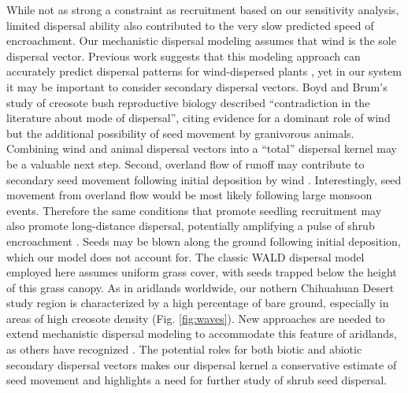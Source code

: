 \documentclass[11pt]{article}\usepackage[]{graphicx}\usepackage[usenames,dvipsnames]{xcolor}
\begin{document}
While not as strong a constraint as recruitment based on our sensitivity analysis, limited dispersal ability also contributed to the very slow predicted speed of encroachment. 
Our mechanistic dispersal modeling assumes that wind is the sole dispersal vector. 
Previous work suggests that this modeling approach can accurately predict dispersal patterns for wind-dispersed plants \citep{skarpaas2007dispersal}, yet in our system it may be important to consider secondary dispersal vectors. 
Boyd and Brum's \citeyear{boyd1983postdispersal} study of creosote bush reproductive biology described ``contradiction in the literature about mode of dispersal'', citing evidence for a dominant role of wind but the additional possibility of seed movement by granivorous animals. 
Combining wind and animal dispersal vectors into a ``total'' dispersal kernel \citep{rogers2019total} may be a valuable next step. 
Second, overland flow of runoff may contribute to secondary seed movement following initial deposition by wind \citep{thompson2014secondary}. 
Interestingly, seed movement from overland flow would be most likely following large monsoon events. 
Therefore the same conditions that promote seedling recruitment may also promote long-distance dispersal, potentially amplifying a pulse of shrub encroachment \citep{ellner2012temporally}. 
Seeds may be blown along the ground following initial deposition, which our model does not account for.
The classic WALD dispersal model employed here assumes uniform grass cover, with seeds trapped below the height of this grass canopy. 
As in aridlands worldwide, our nothern Chihuahuan Desert study region is characterized by a high percentage of bare ground, especially in areas of high creosote density (Fig. \ref{fig:waves}). 
New approaches are needed to extend mechanistic dispersal modeling to accommodate this feature of aridlands, as others have recognized \citep{thompson2014secondary}. 
The potential roles for both biotic and abiotic secondary dispersal vectors makes our dispersal kernel a conservative estimate of seed movement and highlights a need for further study of shrub seed dispersal. 
\end{document}
